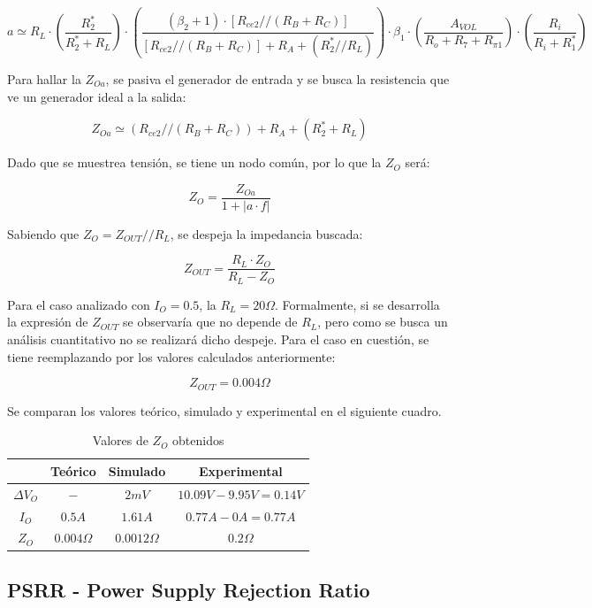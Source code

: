 \[
a \simeq R_L \cdot \left( \frac{R^*_2}{R^*_2 + R_L} \right) \cdot \left( \frac{(\beta_2 + 1) \cdot [R_{ce2}//(R_B+R_C)]}{[R_{ce2}//(R_B+R_C)] + R_A + (R^*_2 // R_L)} \right) \cdot \beta_1 \cdot \left( \frac{A_{VOL}}{R_o + R_7 + R_{\pi1}} \right) \cdot \left( \frac{R_i}{R_i + R^*_1} \right)
\]

Para hallar la $Z_{Oa}$, se pasiva el generador de entrada y se busca la resistencia que ve un generador ideal a la salida:

\[
Z_{Oa} \simeq (R_{ce2} // (R_B+R_C))+R_A+(R^*_2+R_L)
\]

Dado que se muestrea tensi\'on, se tiene un nodo com\'un, por lo que la $Z_O$ ser\'a:

\[
Z_O = \frac{Z_{Oa}}{1+|a\cdot f|}
\]

Sabiendo que $Z_O = Z_{OUT} // R_L$, se despeja la impedancia buscada:

\[
Z_{OUT} = \frac{R_L \cdot Z_O}{R_L - Z_O}
\]

Para el caso analizado con $I_O = 0.5$, la $R_L = 20\Omega$. Formalmente, si se desarrolla la expresi\'on de $Z_{OUT}$ se observar\'ia que no depende de $R_L$, pero como se busca un an\'alisis cuantitativo no se realizar\'a dicho despeje. Para el caso en cuesti\'on, se tiene reemplazando por los valores calculados anteriormente:

\[
Z_{OUT} = 0.004\Omega
\]

Se comparan los valores te\'orico, simulado y experimental en el siguiente cuadro.

\begin{table}[!ht]

\begin{center}
\begin{tabular}{|c||c|c|c|}
\hline
& Te\'orico & Simulado & Experimental\\
\hline 
$\Delta V_O$ & $-$ & $2mV$ & $10.09V-9.95V=0.14V$\\
\hline 
$I_O$ &  $0.5A$    &   $1.61A$     & $0.77A - 0A = 0.77A$\\
\hline
$Z_O$ &   $0.004\Omega$   &    $0.0012\Omega$    & $0.2\Omega$\\
\hline
\end{tabular}
\end{center}

\caption{Valores de $Z_O$ obtenidos}
\end{table}


\subsection{PSRR - Power Supply Rejection Ratio}

